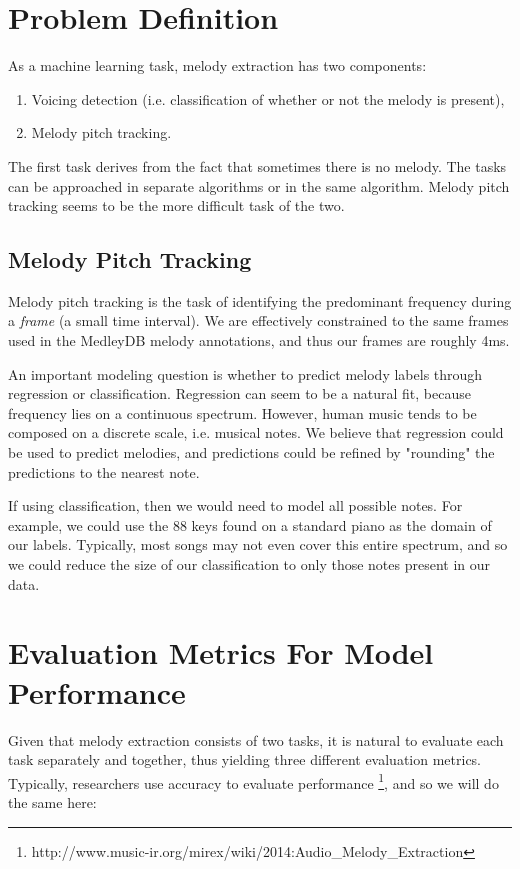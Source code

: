 \documentclass{article} %
\begin{document}
\section{Problem Definition}
As a machine learning task, melody extraction has two components:

\begin{enumerate}
\item Voicing detection (i.e. classification of whether or not the melody is present),
\item Melody pitch tracking.
\end{enumerate}

The first task derives from the fact that sometimes there is no melody.  The tasks can be approached in separate algorithms or in the same algorithm.  Melody pitch tracking seems to be the more difficult task of the two.

\subsection{Melody Pitch Tracking}
Melody pitch tracking is the task of identifying the predominant frequency during a \textit{frame} (a small time interval).  We are effectively constrained to the same frames used in the MedleyDB melody annotations, and thus our frames are roughly 4ms.

An important modeling question is whether to predict melody labels through regression or classification.  Regression can seem to be a natural fit, because frequency lies on a continuous spectrum.  However, human music tends to be composed on a discrete scale, i.e. musical notes.  We believe that regression could be used to predict melodies, and predictions could be refined by "rounding" the predictions to the nearest note.

If using classification, then we would need to model all possible notes.  For example, we could use the 88 keys found on a standard piano as the domain of our labels.  Typically, most songs may not even cover this entire spectrum, and so we could reduce the size of our classification to only those notes present in our data.


\section{Evaluation Metrics For Model Performance}
Given that melody extraction consists of two tasks, it is natural to evaluate each task separately and together, thus yielding three different evaluation metrics.  Typically, researchers use accuracy to evaluate performance \footnote{http://www.music-ir.org/mirex/wiki/2014:Audio\_Melody\_Extraction}, and so we will do the same here:
\end{document}
